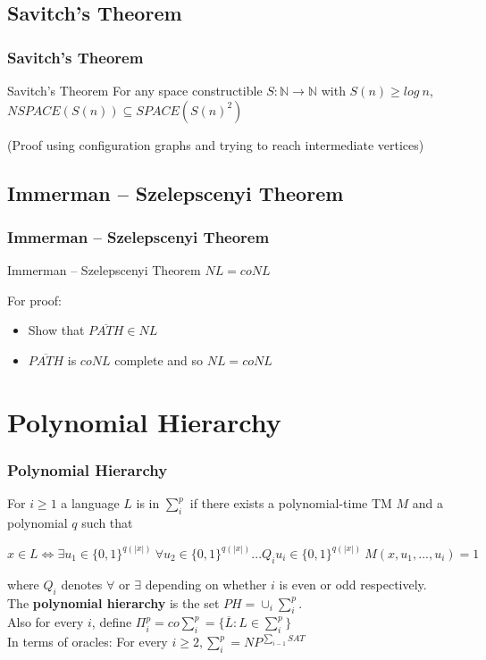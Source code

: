 \documentclass{beamer}
\begin{document}
\subsection{Savitch's Theorem}

\begin{frame}
\frametitle{Savitch's Theorem}

\begin{block}{Savitch's Theorem}
For any space constructible $S: \mathbb{N} \to \mathbb{N}$ with $S(n) \geq log\ n$, $NSPACE(S(n)) \subseteq SPACE(S(n)^2)$
\end{block}

(Proof using configuration graphs and trying to reach intermediate vertices)

\end{frame}

\subsection{Immerman -- Szelepscenyi Theorem}

\begin{frame}
\frametitle{Immerman -- Szelepscenyi Theorem}

\begin{block}{Immerman -- Szelepscenyi Theorem}
$NL = coNL$
\end{block}

For proof:

\begin{itemize}
\item Show that $\overline{PATH} \in NL$
\item $\overline{PATH}$ is $coNL$ complete and so $NL = coNL$
\end{itemize}

\end{frame}

\section{Polynomial Hierarchy}

\begin{frame}
\frametitle{Polynomial Hierarchy}

For $i \geq 1$ a language $L$ is in $\sum_i^p$ if there exists a polynomial-time TM $M$ and a polynomial $q$ such that

\begin{center}
$x \in L \iff \exists u_1 \in \{0,1\}^{q(|x|)}\ \forall u_2 \in \{0,1\}^{q(|x|)}...Q_iu_i \in \{0,1\}^{q(|x|)}\ M(x,u_1,...,u_i) = 1$
\end{center}

where $Q_i$ denotes $\forall$ or $\exists$ depending on whether $i$ is even or odd respectively.\\
The \textbf{polynomial hierarchy} is the set $PH = \cup_i \sum_i^p$.\\
Also for every $i$, define $\Pi_i^p = co\sum_i^p = \{\overline{L}: L \in \sum_i^p\}$\\
In terms of oracles: For every $i \geq 2,\sum_i^p = NP^{\sum_{i-1} SAT}$ 

\end{frame}
\end{document}
